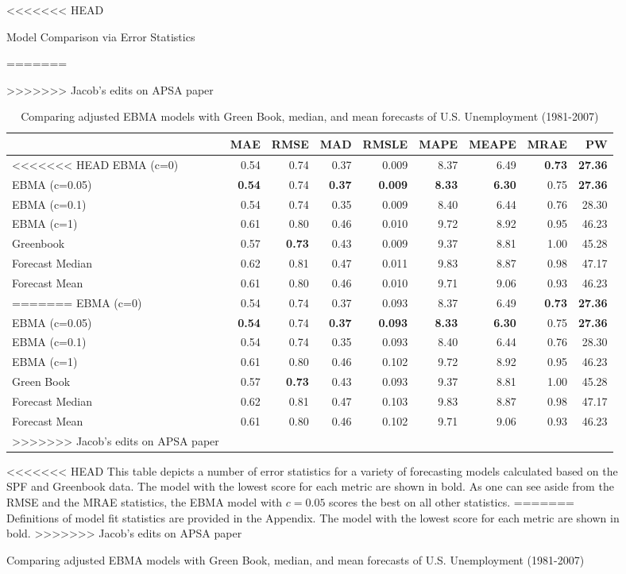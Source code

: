 \documentclass[12pt,fullpage,endnotes]{article}
\begin{document}
\begin{figure}[h]
\begin{table}[h]
<<<<<<< HEAD
\caption{Model Comparison via Error Statistics}
=======
\caption{Comparing adjusted EBMA models with Green Book, median, and mean forecasts of U.S. Unemployment (1981-2007)}
>>>>>>> Jacob's edits on APSA paper
\begin{center}
\begin{tabular}{lrrrrrrrr}
\toprule
 & MAE & RMSE & MAD & RMSLE & MAPE & MEAPE & MRAE & PW \\ 
\midrule
<<<<<<< HEAD
 EBMA (c=0)& 0.54 & 0.74 & 0.37 & 0.009 & 8.37 & 6.49 & \textbf{0.73} & \textbf{27.36} \\ 
  EBMA (c=0.05)& \textbf{0.54} & 0.74 &\textbf{ 0.37} & \textbf{0.009} & \textbf{8.33} & \textbf{6.30} & 0.75 & \textbf{27.36} \\ 
 EBMA (c=0.1)& 0.54 & 0.74 & 0.35 & 0.009 & 8.40 & 6.44 & 0.76 & 28.30 \\ 
EBMA (c=1) & 0.61 & 0.80 & 0.46 & 0.010 & 9.72 & 8.92 & 0.95 & 46.23 \\ 
 Greenbook& 0.57 & \textbf{0.73} & 0.43 & 0.009 & 9.37 & 8.81 & 1.00 & 45.28 \\ 
 Forecast Median& 0.62 & 0.81 & 0.47 & 0.011 & 9.83 & 8.87 & 0.98 & 47.17 \\ 
Forecast Mean& 0.61 & 0.80 & 0.46 & 0.010 & 9.71 & 9.06 & 0.93 & 46.23 \\ 
=======
 EBMA (c=0)& 0.54 & 0.74 & 0.37 & 0.093 & 8.37 & 6.49 & \textbf{0.73} & \textbf{27.36} \\ 
  EBMA (c=0.05)& \textbf{0.54} & 0.74 &\textbf{ 0.37} & \textbf{0.093} & \textbf{8.33} & \textbf{6.30} & 0.75 & \textbf{27.36} \\ 
 EBMA (c=0.1)& 0.54 & 0.74 & 0.35 & 0.093 & 8.40 & 6.44 & 0.76 & 28.30 \\ 
EBMA (c=1) & 0.61 & 0.80 & 0.46 & 0.102 & 9.72 & 8.92 & 0.95 & 46.23 \\ 
 Green Book& 0.57 & \textbf{0.73} & 0.43 & 0.093 & 9.37 & 8.81 & 1.00 & 45.28 \\ 
 Forecast Median& 0.62 & 0.81 & 0.47 & 0.103 & 9.83 & 8.87 & 0.98 & 47.17 \\ 
Forecast Mean& 0.61 & 0.80 & 0.46 & 0.102 & 9.71 & 9.06 & 0.93 & 46.23 \\ 
>>>>>>> Jacob's edits on APSA paper
\bottomrule
\end{tabular}
\end{center}

\label{compareTable1}
<<<<<<< HEAD
This table depicts a number of error statistics for a variety of forecasting models calculated based on the SPF and Greenbook data. The model with the lowest score for each metric are shown in bold. As one can see aside from the RMSE and the MRAE statistics, the EBMA model with $c=0.05$ scores the best on all other statistics. 
=======
 Definitions of model fit statistics are provided in the Appendix. The model with the lowest score for each metric are shown in bold.  
>>>>>>> Jacob's edits on APSA paper
\end{table}


\end{figure}
\end{document}
